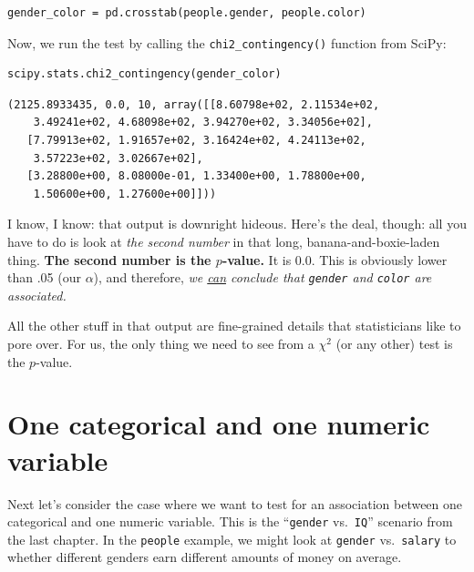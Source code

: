 \begin{Verbatim}[fontsize=\small,samepage=true,frame=single,framesep=3mm]
gender_color = pd.crosstab(people.gender, people.color)
\end{Verbatim}

Now, we run the test by calling the \texttt{chi2\_contingency()} function from
SciPy:

\begin{Verbatim}[fontsize=\footnotesize,samepage=true,frame=single,framesep=3mm]
scipy.stats.chi2_contingency(gender_color)
\end{Verbatim}
\vspace{-.2in}

\begin{Verbatim}[fontsize=\small,samepage=true,frame=leftline,framesep=5mm,framerule=1mm]
(2125.8933435, 0.0, 10, array([[8.60798e+02, 2.11534e+02, 
    3.49241e+02, 4.68098e+02, 3.94270e+02, 3.34056e+02],
   [7.79913e+02, 1.91657e+02, 3.16424e+02, 4.24113e+02, 
    3.57223e+02, 3.02667e+02],
   [3.28800e+00, 8.08000e-01, 1.33400e+00, 1.78800e+00, 
    1.50600e+00, 1.27600e+00]]))
\end{Verbatim}

I know, I know: that output is downright hideous. Here's the deal, though: all
you have to do is look at \textit{the second number} in that long,
banana-and-boxie-laden thing. \textbf{The second number is the $p$-value.} It is
0.0. This is obviously lower than .05 (our $\alpha$), and therefore, \textit{we
\underline{can} conclude that \texttt{gender} and \texttt{color} are
associated.}

All the other stuff in that output are fine-grained details that statisticians
like to pore over. For us, the only thing we need to see from a $\chi^2$ (or
any other) test is the $p$-value.

\section[One categorical, one numeric variable]{One categorical and one numeric variable}

Next let's consider the case where we want to test for an association between
one categorical and one numeric variable. This is the ``\texttt{gender}
vs.~\texttt{IQ}'' scenario from the last chapter. In the \texttt{people}
example, we might look at \texttt{gender} vs.~\texttt{salary} to whether
different genders earn different amounts of money on average.

